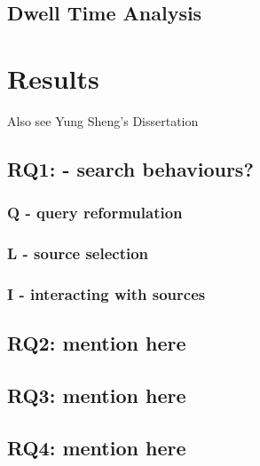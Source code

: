 \documentclass[a4paper, nobind]{templates/ociamthesis}
\begin{document}
\hypertarget{dwell-time-analysis}{%
\section{Dwell Time Analysis}\label{dwell-time-analysis}}

\hypertarget{results}{%
\chapter{Results}\label{results}}

Also see Yung Sheng's Dissertation

\hypertarget{rq1---search-behaviours}{%
\section{RQ1: - search behaviours?}\label{rq1---search-behaviours}}

\hypertarget{q---query-reformulation}{%
\subsection{Q - query reformulation}\label{q---query-reformulation}}

\hypertarget{l---source-selection}{%
\subsection{L - source selection}\label{l---source-selection}}

\hypertarget{i---interacting-with-sources}{%
\subsection{I - interacting with sources}\label{i---interacting-with-sources}}

\hypertarget{rq2-mention-here}{%
\section{RQ2: mention here}\label{rq2-mention-here}}

\hypertarget{rq3-mention-here}{%
\section{RQ3: mention here}\label{rq3-mention-here}}

\hypertarget{rq4-mention-here}{%
\section{RQ4: mention here}\label{rq4-mention-here}}
\end{document}
